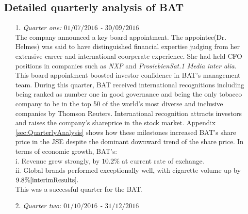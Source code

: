 \documentclass[letterpaper, 10 pt, conference]{ieeeconf}  %
\begin{document}
\subsection*{Detailed quarterly analysis of BAT}

 	\begin{enumerate}
 		\item[1.]\textit{Quarter one: $01/07/2016$ - $ 30/09/2016$}
 		\\
 		The company announced a key board appointment. The appointee(Dr. Helmes) was said to have distinguished financial expertise judging from her extensive career  and international coorperate experience. She had held CFO positions in companies such as \textit{NXP} and  \textit{ProsiebienSat.1 Media} \textit{inter alia}\cite{Board_Appointment}. This board appointment boosted investor confidence in BAT's management team. During this quarter,  BAT received international recognitions including being ranked as number one in good governance and being the only tobacco company to be in the top 50 of the world's most diverse and inclusive companies by Thomson Reuters. International recognition attracts investors and raises the company's shareprice in the stock market. Appendix \ref{sec:QuarterlyAnalysis} shows how these milestones increased BAT's share price in the JSE despite the dominant downward trend of the share price. In terms of economic growth, BAT's:
 		\\
 		\hspace{2.00cm}i. Revenue grew strongly, by $10.2\%$ at current rate of exchange\cite{interimResults}.
 		\\
 		\hspace{1.8500cm} ii. Global brands performed exceptionally well, with cigarette volume up by $9.8\%\cite{interimResults}.$	
 		\\
 		This was a successful quarter for the BAT.
 		\item[2.]\textit{Quarter two: $01/10/2016$ - $31/12/2016$}
 		\\

\end{enumerate}
\end{document}
